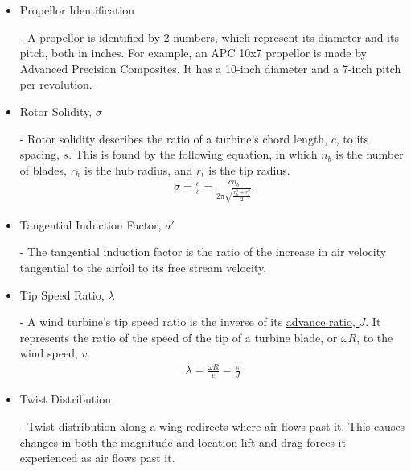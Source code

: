 \documentclass{article}
\begin{document}
\begin{itemize}
	\item \hypertarget{APC}{Propellor Identification} - A propellor is identified by 2 numbers, which represent its diameter and its pitch, both in inches. For example, an APC 10x7 propellor is made by Advanced Precision Composites. It has a 10-inch diameter and a 7-inch pitch per revolution.
	
	\item \hypertarget{sigma}{Rotor Solidity, $\sigma$} - Rotor solidity describes the ratio of a turbine's chord length, $c$, to its spacing, $s$. This is found by the following equation, in which $n_{b}$ is the number of blades, $r_{h}$ is the hub radius, and $r_{t}$ is the tip radius.
	\begin{equation}
	\begin{aligned}
		\sigma = \frac{c}{s} = \frac{c n_{b}}{2 \pi \sqrt{\frac{r^{2}_{h} + r^{2}_{t}}{2}}}
	\end{aligned}
	\end{equation}
	
	\item \hypertarget{a'}{Tangential Induction Factor, $a'$} - The tangential induction factor is the ratio of the increase in air velocity tangential to the airfoil to its free stream velocity.
	
	\item \hypertarget{lambda}{Tip Speed Ratio, $\lambda$} - A wind turbine's tip speed ratio is the inverse of its \hyperlink{J}{advance ratio, $J$}. It represents the ratio of the speed of the tip of a turbine blade, or $\omega R$, to the wind speed, $v$.
	\begin{equation}
	\begin{aligned}
		\lambda = \frac{\omega R}{v} = \frac{\pi}{J}
	\end{aligned}
	\end{equation}
	
	\item \hypertarget{T}{Twist Distribution} - Twist distribution along a wing redirects where air flows past it. This causes changes in both the magnitude and location lift and drag forces it experienced as air flows past it.
	
\end{itemize}
\end{document}
